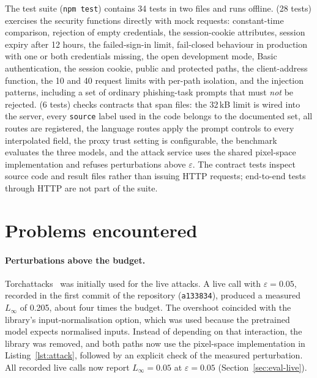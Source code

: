 The test suite (\texttt{npm test}) contains 34 tests in two files and runs offline.  (28 tests) exercises the security functions directly with mock requests: constant-time comparison, rejection of empty credentials, the session-cookie attributes, session expiry after 12 hours, the failed-sign-in limit, fail-closed behaviour in production with one or both credentials missing, the open development mode, Basic authentication, the session cookie, public and protected paths, the client-address function, the 10 and 40 request limits with per-path isolation, and the injection patterns, including a set of ordinary phishing-task prompts that must \emph{not} be rejected.  (6 tests) checks contracts that span files: the 32\,kB limit is wired into the server, every \texttt{source} label used in the code belongs to the documented set, all routes are registered, the language routes apply the prompt controls to every interpolated field, the proxy trust setting is configurable, the benchmark evaluates the three models, and the attack service uses the shared pixel-space implementation and refuses perturbations above $\varepsilon$. The contract tests inspect source code and result files rather than issuing HTTP requests; end-to-end tests through HTTP are not part of the suite.

\section{Problems encountered}
\label{sec:problems}

\paragraph{Perturbations above the budget.} Torchattacks~\cite{kim2020torchattacks} was initially used for the live attacks. A live call with $\varepsilon = 0.05$, recorded in the first commit of the repository (\texttt{a133834}), produced a measured $L_\infty$ of 0.205, about four times the budget. The overshoot coincided with the library's input-normalisation option, which was used because the pretrained model expects normalised inputs. Instead of depending on that interaction, the library was removed, and both paths now use the pixel-space implementation in Listing~\ref{lst:attack}, followed by an explicit check of the measured perturbation. All recorded live calls now report $L_\infty = 0.05$ at $\varepsilon = 0.05$ (Section~\ref{sec:eval-live}).

